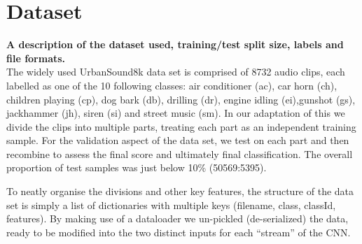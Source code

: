 \documentclass[conference]{IEEEtran}
\begin{document}
\section{Dataset} \label{section:dataset}
\textbf{A description of the dataset used, training/test split size, labels and file formats.}\\

The widely used UrbanSound8k data set is comprised of 8732 audio clips, each labelled as one of the 10 following classes: air conditioner (ac), car horn (ch), children playing (cp), dog bark (db), drilling (dr), engine idling (ei),gunshot (gs), jackhammer (jh), siren (si) and street music (sm). In our adaptation of this we divide the clips into multiple parts, treating each part as an independent training sample. For the validation aspect of the data set, we test on each part and then recombine to assess the final score and ultimately final classification. The overall proportion of test samples was just below 10\% (50569:5395). 

To neatly organise the divisions and other key features, the structure of the data set is simply a list of dictionaries with multiple keys (filename, class, classId, features). By making use of a dataloader we un-pickled (de-serialized) the data, ready to be modified into the two distinct inputs for each ``stream'' of the CNN. 

\end{document}
